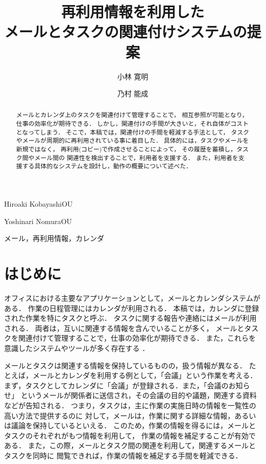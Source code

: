 \documentclass[submit,techreq,noauthor,dvipdfmx]{ipsj}
\begin{document}
\title{再利用情報を利用した\\メールとタスクの関連付けシステムの提案}


\author{小林 寛明}{Hiroaki Kobayashi}{OU}
\author{乃村 能成}{Yoshinari Nomura}{OU}

\begin{abstract}
  メールとカレンダ上のタスクを関連付けて管理することで，
  相互参照が可能となり，仕事の効率化が期待できる．
  しかし，関連付けの手間が大きいと，それ自体がコストとなってしまう．
  そこで，本稿では，関連付けの手間を軽減する手法として，
  タスクやメールが周期的に再利用されている事に着目した．
  具体的には，タスクやメールを新規ではなく，
  再利用(コピー)で作成させることによって，
  その履歴を蓄積し，タスク間やメール間の
  関連性を検出することで，利用者を支援する．
  また，利用者を支援する具体的なシステムを設計し，動作の概要について述べた．
\end{abstract}

\begin{jkeyword}
  メール，再利用情報，カレンダ
\end{jkeyword}
\maketitle

\section{はじめに}

オフィスにおける主要なアプリケーションとして，メールとカレンダシステムがある．
作業の日程管理にはカレンダが利用される．
本稿では，カレンダに登録された作業を特にタスクと呼ぶ．
タスクに関する報告や連絡にはメールが利用される．
両者は，互いに関連する情報を含んでいることが多く，
メールとタスクを関連付けて管理することで，仕事の効率化が期待できる．
また，これらを意識したシステムやツールが多く存在する
\cite{GoogleTasks}\cite{Mac_app}．

メールとタスクは関連する情報を保持しているものの，扱う情報が異なる．
たとえば，メールとカレンダを利用する例として，「会議」という作業を考える．
まず，タスクとしてカレンダに「会議」が登録される．また，「会議のお知らせ」
というメールが関係者に送信され，その会議の目的や議題，関連する資料などが告知される．
つまり，タスクは，主に作業の実施日時の情報を一覧性の高い方法で提供するのに
対して，メールは，作業に関する詳細な情報，あるいは議論を保持しているといえる．
このため，作業の情報を得るには，メールとタスクのそれぞれがもつ情報を利用して，
作業の情報を補足することが有効である．
また，この際，メールとタスク間の関連を利用して，関連するメールとタスクを同時に
閲覧できれば，作業の情報を補足する手間を軽減できる．
\end{document}
